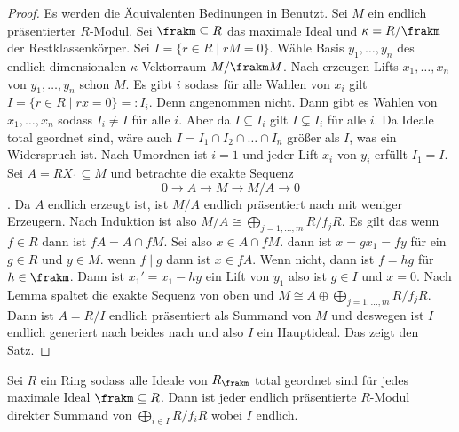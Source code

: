 \begin{proof}
	Es werden die Äquivalenten Bedinungen in  Benutzt.
	Sei \(M\) ein endlich präsentierter \(R\)-Modul. Sei \(\frakm\subseteq R\) das maximale Ideal und \(\kappa=R/\frakm\) der Restklassenkörper. Sei \(I=\{r\in R\mid rM=0\}\). Wähle Basis \(y_1,\dots,y_n\) des endlich-dimensionalen \(\kappa\)-Vektorraum \(M/\frakm M\).
	Nach  erzeugen Lifts \(x_1,\dots,x_n\) von \(y_1,\dots,y_n\) schon \(M\).
	Es gibt \(i\) sodass für alle Wahlen von \(x_i\) gilt \(I=\{r\in R\mid rx=0\}=\colon I_i\). Denn angenommen nicht. Dann gibt es Wahlen von \(x_1,\dots,x_n\) sodass \(I_i\neq I\) für alle \(i\). Aber da \(I\subseteq I_i\) gilt \(I\subsetneq I_i\) für alle \(i\). Da Ideale total geordnet sind, wäre auch \(I=I_1\cap I_2\cap\dots\cap I_n\) größer als \(I\), was ein Widerspruch ist. Nach Umordnen ist \(i=1\) und jeder Lift \(x_i\) von \(y_i\) erfüllt \(I_1=I\). Sei \(A=RX_1\subseteq M\) und betrachte die exakte Sequenz 
	\[0\to A\to M\to M/A\to 0\]. Da \(A\) endlich erzeugt ist, ist \(M/A\) endlich präsentiert nach  mit weniger Erzeugern. Nach Induktion ist also \(M/A\cong\bigoplus_{j=1,\dots,m}R/f_jR\). Es gilt das wenn \(f\in R\) dann ist \(fA=A\cap fM\). Sei also \(x\in A\cap fM\). dann ist \(x=gx_1=fy\) für ein \(g\in R\) und \(y\in M\). wenn \(f\mid g\) dann ist \(x\in fA\). Wenn nicht, dann ist \(f=hg\) für \(h\in\frakm\). Dann ist \(x_1'=x_1-hy\) ein Lift von \(y_1\) also ist \(g\in I\) und \(x=0\). Nach Lemma  spaltet die exakte Sequenz von oben und \(M\cong A\oplus\bigoplus_{j=1,\dots,m}R/f_jR\). Dann ist \(A=R/I\) endlich präsentiert als Summand von \(M\) und deswegen ist \(I\) endlich generiert nach beides nach  und also \(I\) ein Hauptideal. Das zeigt den Satz.
	
\end{proof}
\begin{Lemma}\label{Lem:IdealTotOrdDirSum}
	Sei \(R\) ein Ring sodass alle Ideale von \(R_\frakm\) total geordnet sind für jedes maximale Ideal \(\frakm\subseteq R\). Dann ist jeder endlich präsentierte \(R\)-Modul direkter Summand von \(\bigoplus_{i\in I}R/f_iR\) wobei \(I\) endlich.
\end{Lemma}
